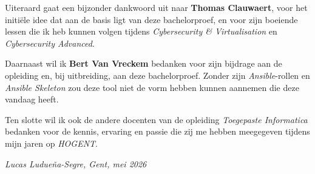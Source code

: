 Uiteraard gaat een bijzonder dankwoord uit naar \textbf{Thomas Clauwaert}, voor het initiële idee dat aan de basis ligt van deze bachelorproef, en voor zijn boeiende lessen die ik heb kunnen volgen tijdens \emph{Cybersecurity \& Virtualisation} en \emph{Cybersecurity Advanced}.

Daarnaast wil ik \textbf{Bert Van Vreckem} bedanken voor zijn bijdrage aan de opleiding en, bij uitbreiding, aan deze bachelorproef. Zonder zijn \emph{Ansible}-rollen en \emph{Ansible Skeleton} zou deze tool niet de vorm hebben kunnen aannemen die deze vandaag heeft.

Ten slotte wil ik ook de andere docenten van de opleiding \emph{Toegepaste Informatica} bedanken voor de kennis, ervaring en passie die zij me hebben meegegeven tijdens mijn jaren op \emph{HOGENT}.

\begin{flushright}
    \emph{Lucas Ludueña-Segre, Gent, mei 2026}
\end{flushright}